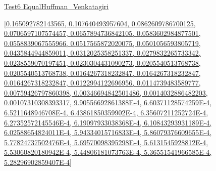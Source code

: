 \documentclass[12pt]{article}
\begin{document}
\noindent \url{Test6 EqualHuffman_Venkatagiri}

\noindent \url{[0.165092782143565, 0.107640493957604, 0.0862609786700125, 0.0706597107574457, 0.0657894736842105, 0.0583602984877501, 0.0558839067555966, 0.0517565872020075, 0.0501056593805719, 0.0435844944859011, 0.0312025358251337, 0.0279832265733342, 0.0238559070197451, 0.0230304431090273, 0.0205540513768738, 0.0205540513768738, 0.0164267318232847, 0.0164267318232847, 0.0164267318232847, 0.0122994122696956, 0.0114739483589777, 0.00759426797860398, 0.00346694842501486, 0.0014032886482203, 0.00107310308393317, 9.90556692861388E-4, 6.60371128574259E-4, 6.5211648946708E-4, 6.43861850359902E-4, 6.35607211252724E-4, 6.27352572145546E-4, 6.19097933038368E-4, 6.10843293931189E-4, 6.02588654824011E-4, 5.94334015716833E-4, 5.86079376609655E-4, 5.77824737502476E-4, 5.69570098395298E-4, 5.6131545928812E-4, 5.53060820180942E-4, 5.44806181073763E-4, 5.36551541966585E-4, 5.28296902859407E-4]}
\end{document}
